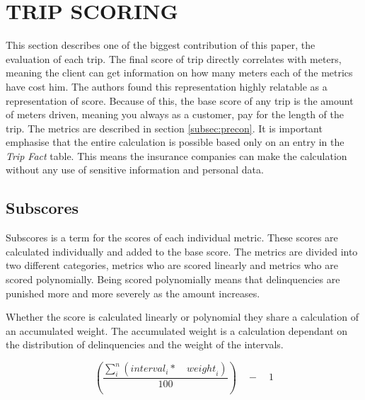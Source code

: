 \section{TRIP SCORING}\label{sec:trip}

This section describes one of the biggest contribution of this paper, the evaluation of each trip. The final score of trip directly correlates with meters, meaning the client can get information on how many meters each of the metrics have cost him. The authors found this representation highly relatable as a representation of score.
Because of this, the base score of any trip is the amount of meters driven, meaning you always as a customer, pay for the length of the trip. The metrics are described in section \ref{subsec:precon}.
It is important emphasise that the entire calculation is possible based only on an entry in the \textit{Trip Fact} table. This means the insurance companies can make the calculation without any use of sensitive information and personal data.

\subsection{Subscores} 

Subscores is a term for the scores of each individual metric. These scores are calculated individually and added to the base score. The metrics are divided into two different categories, metrics who are scored linearly and metrics who are scored polynomially. Being scored polynomially means that delinquencies are punished more and more severely as the amount increases.

Whether the score is calculated linearly or polynomial they share a calculation of an accumulated weight. The accumulated weight is a calculation dependant on the distribution of delinquencies and the weight of the intervals.

$$
\left( \frac { \sum _{ i }^{ n }{ \left( { interval }_{ i }*\quad { weight }_{ i } \right)  }  }{ 100 }  \right) \quad -\quad 1
$$

